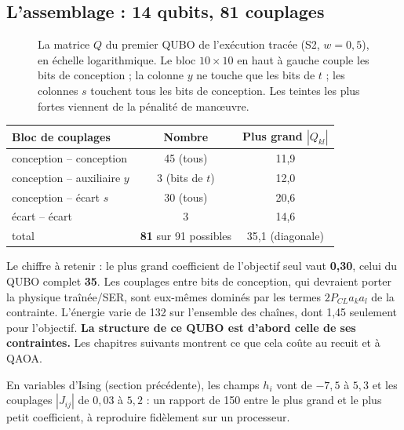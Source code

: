 \subsection{L'assemblage : 14 qubits, 81 couplages}
\begin{figure}[htbp]
\centering

\caption{La matrice $Q$ du premier QUBO de l'exécution tracée (S2, $w=0{,}5$), en échelle logarithmique. Le bloc $10\times10$ en haut à gauche couple les bits de conception ; la colonne $y$ ne touche que les bits de $t$ ; les colonnes $s$ touchent tous les bits de conception. Les teintes les plus fortes viennent de la pénalité de manœuvre.}\label{fig:matrice-q-v2}
\end{figure}
\begin{center}
\renewcommand{\arraystretch}{1.2}
\begin{tabular}{lcc}
\toprule
Bloc de couplages & Nombre & Plus grand $|Q_{kl}|$ \\
\midrule
conception -- conception & 45 (tous) & 11,9 \\
conception -- auxiliaire $y$ & 3 (bits de $t$) & 12,0 \\
conception -- écart $s$ & 30 (tous) & 20,6 \\
écart -- écart & 3 & 14,6 \\
\midrule
total & \textbf{81} sur 91 possibles & 35,1 (diagonale) \\
\bottomrule
\end{tabular}
\end{center}
Le chiffre à retenir : le plus grand coefficient de l'objectif seul vaut \textbf{0,30}, celui du QUBO complet \textbf{35}. Les couplages entre bits de conception, qui devraient porter la physique traînée/SER, sont eux-mêmes dominés par les termes $2P_{CL}a_ka_l$ de la contrainte. L'énergie varie de 132 sur l'ensemble des chaînes, dont 1,45 seulement pour l'objectif. \textbf{La structure de ce QUBO est d'abord celle de ses contraintes.} Les chapitres suivants montrent ce que cela coûte au recuit et à QAOA.

En variables d'Ising (section précédente), les champs $h_i$ vont de $-7{,}5$ à $5{,}3$ et les couplages $|J_{ij}|$ de $0{,}03$ à $5{,}2$ : un rapport de 150 entre le plus grand et le plus petit coefficient, à reproduire fidèlement sur un processeur.

